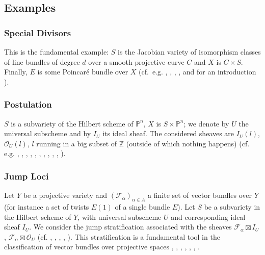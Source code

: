 \setcounter{subsection}{1}
\subsection{Examples}\label{chap6-sec7.2}

\subsubsection{Special Divisors}\label{chap6-sec7.2.1}

This is the fundamental example: $S$ is the Jacobian variety of
isomorphism classes of line bundles of degree $d$ over a smooth
projective curve $C$ and $X$ is $C\times S$. Finally,\pageoriginale
$E$ is some Poincar\'e bundle over $X$
(cf.~e.g. \cite{chap6-GH2}, \cite{chap6-G} \cite{chap6-FL}, \cite{chap6-EH1},
\cite{chap6-EH2}, \cite{chap6-T} and for an
introduction \cite{chap6-Ha}).

\subsubsection{Postulation}\label{chap6-sec7.2.2}

$S$ is a subvariety of the Hilbert scheme of $\mathbb{P}^{n}$, $X$ is
$S\times \mathbb{P}^{n}$; we denote by $U$ the universal subscheme and
by $I_{U}$ its ideal sheaf. The considered sheaves are $I_{U}(l)$,
$\mathscr{O}_{U}(l)$, $l$ running in a big subset of $\mathbb{Z}$
(outside of which nothing happens)
(cf. e.g. \cite{chap6-E11}, \cite{chap6-GP1}, \cite{chap6-GP2}, \cite{chap6-GLP}, \cite{chap6-H3}, \cite{chap6-HH1}, \cite{chap6-Hi}, \cite{chap6-BE1}, \cite{chap6-BE3}, \cite{chap6-BE4}, \cite{chap6-BH4}).

\subsubsection{Jump Loci}\label{chap6-sec7.2.3}

Let $Y$ be a projective variety and $(\mathscr{F}_{\alpha})_{\alpha\in
A}$ a finite set of vector bundles over $Y$ (for instance a set of
twists $E(1)$ of a single bundle $E$). Let $S$ be a subvariety in the
Hilbert scheme of $Y$, with universal subscheme $U$ and corresponding
ideal sheaf $I_{U}$. We consider the jump stratification associated
with the sheaves $\mathscr{F}_{\alpha}\boxtimes I_{U}$,
$\mathscr{F}_{\alpha}\boxtimes \mathscr{O}_{U}$ (cf. \cite{chap6-BH1},
\cite{chap6-BH2}, \cite{chap6-BH3}, \cite{chap6-Ch}, \cite{chap6-BHM}). This
stratification is a fundamental tool in the classification of vector
bundles over projective
spaces \cite{chap6-Schw}, \cite{chap6-VdV}, \cite{chap6-BV1}, \cite{chap6-BV2}, \cite{chap6-B2}, \cite{chap6-B3}, \cite{chap6-Hu1}.

